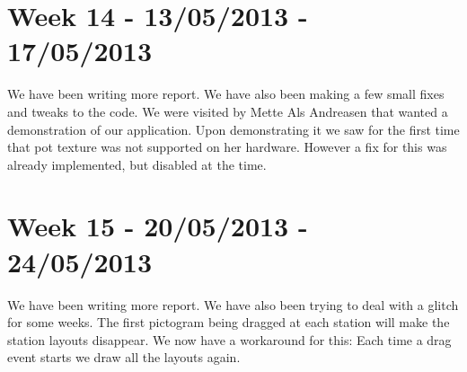 \section*{Week 14 - 13/05/2013 - 17/05/2013}
We have been writing more report. We have also been making a few small fixes and tweaks to the code.
We were visited by Mette Als Andreasen that wanted a demonstration of our application. Upon demonstrating it we saw for the first time that \ac{pot} texture was not supported on her hardware. However a fix for this was already implemented, but disabled at the time.

\section*{Week 15 - 20/05/2013 - 24/05/2013}
We have been writing more report. We have also been trying to deal with a glitch for some weeks. The first pictogram being dragged at each station will make the station layouts disappear. We now have a workaround for this: Each time a drag event starts we draw all the layouts again.
